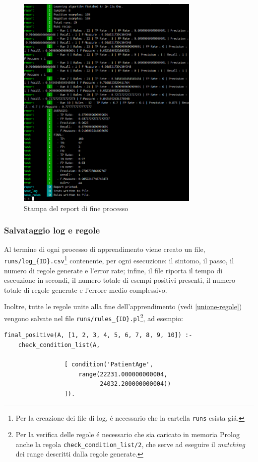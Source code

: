 \documentclass[preprint]{acm_proc_article-sp}
\begin{document}
\begin{figure}[!h]
\centering
\includegraphics[width=250pt]{figures/prolog-report.png}
\caption{Stampa del report di fine processo}
\label{fig:prolog-report}
\end{figure}

\subsubsection{Salvataggio log e regole}

Al termine di ogni processo di apprendimento viene creato un file, \verb|runs/log_{ID}.csv|\footnote{Per la creazione dei file di log, \'e necessario che la cartella \verb|runs| esista gi\'a.} contenente, per ogni esecuzione: il sintomo, il passo, il numero di regole generate e l'error rate; infine, il file riporta il tempo di esecuzione in secondi, il numero totale di esempi positivi presenti, il numero totale di regole generate e l'errore medio complessivo.

Inoltre, tutte le regole unite alla fine dell'apprendimento (vedi \ref{unione-regole}) vengono salvate nel file \verb|runs/rules_{ID}.pl|\footnote{Per la verifica delle regole \'e necessario che sia caricato in memoria Prolog anche la regola \verb|check_condition_list/2|, che serve ad eseguire il \textit{matching} dei range descritti dalla regole generate.}, ad esempio:
\begin{verbatim}
final_positive(A, [1, 2, 3, 4, 5, 6, 7, 8, 9, 10]) :-
	check_condition_list(A,
			     
			     [ condition('PatientAge',
					 range(22231.000000000004,
					       24032.200000000004))
			     ]).
\end{verbatim}
\end{document}
